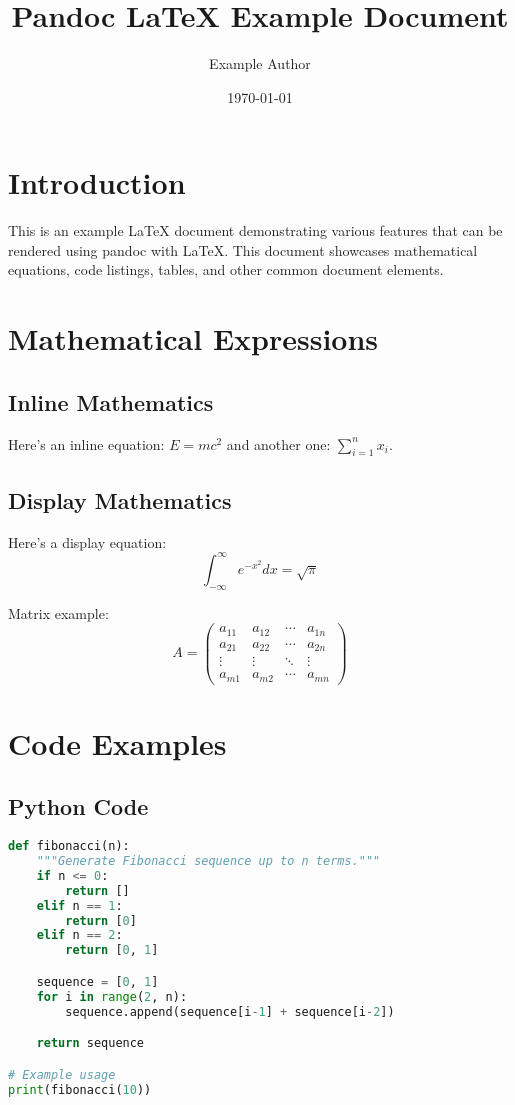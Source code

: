 \documentclass{article}
\title{Pandoc LaTeX Example Document}
\author{Example Author}
\date{\today}
\begin{document}
\maketitle

\tableofcontents
\newpage

\section{Introduction}

This is an example LaTeX document demonstrating various features that can be rendered using pandoc with LaTeX. This document showcases mathematical equations, code listings, tables, and other common document elements.

\section{Mathematical Expressions}

\subsection{Inline Mathematics}
Here's an inline equation: $E = mc^2$ and another one: $\sum_{i=1}^{n} x_i$.

\subsection{Display Mathematics}
Here's a display equation:
\begin{equation}
\int_{-\infty}^{\infty} e^{-x^2} dx = \sqrt{\pi}
\end{equation}

Matrix example:
\begin{equation}
A = \begin{pmatrix}
a_{11} & a_{12} & \cdots & a_{1n} \\
a_{21} & a_{22} & \cdots & a_{2n} \\
\vdots & \vdots & \ddots & \vdots \\
a_{m1} & a_{m2} & \cdots & a_{mn}
\end{pmatrix}
\end{equation}

\section{Code Examples}

\subsection{Python Code}
\begin{lstlisting}[language=Python, caption=Python example]
def fibonacci(n):
    """Generate Fibonacci sequence up to n terms."""
    if n <= 0:
        return []
    elif n == 1:
        return [0]
    elif n == 2:
        return [0, 1]

    sequence = [0, 1]
    for i in range(2, n):
        sequence.append(sequence[i-1] + sequence[i-2])

    return sequence

# Example usage
print(fibonacci(10))
\end{lstlisting}
\end{document}

